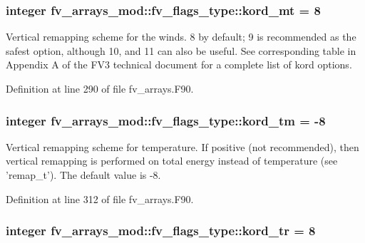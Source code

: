 \subsubsection[{kord\-\_\-mt}]{\setlength{\rightskip}{0pt plus 5cm}integer fv\-\_\-arrays\-\_\-mod\-::fv\-\_\-flags\-\_\-type\-::kord\-\_\-mt = 8}\label{structfv__arrays__mod_1_1fv__flags__type_aac512996328887adf30b7db1c7235de2}


Vertical remapping scheme for the winds. 8 by default; 9 is recommended as the safest option, although 10, and 11 can also be useful. See corresponding table in Appendix A of the F\-V3 technical document for a complete list of kord options. 



Definition at line 290 of file fv\-\_\-arrays.\-F90.

\subsubsection[{kord\-\_\-tm}]{\setlength{\rightskip}{0pt plus 5cm}integer fv\-\_\-arrays\-\_\-mod\-::fv\-\_\-flags\-\_\-type\-::kord\-\_\-tm = -\/8}\label{structfv__arrays__mod_1_1fv__flags__type_a97fa1725f727c163a6a90457a32c717c}


Vertical remapping scheme for temperature. If positive (not recommended), then vertical remapping is performed on total energy instead of temperature (see 'remap\-\_\-t'). The default value is -\/8. 



Definition at line 312 of file fv\-\_\-arrays.\-F90.

\subsubsection[{kord\-\_\-tr}]{\setlength{\rightskip}{0pt plus 5cm}integer fv\-\_\-arrays\-\_\-mod\-::fv\-\_\-flags\-\_\-type\-::kord\-\_\-tr = 8}\label{structfv__arrays__mod_1_1fv__flags__type_afbfcb1b09e9aa21acdbcdaeccd8caf20}


